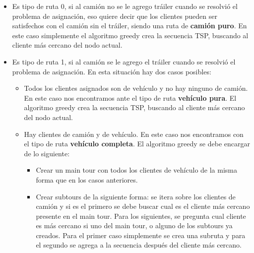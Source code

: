 \documentclass[letter, 10pt]{article}
\begin{document}
\begin{itemize}
    \item Es tipo de ruta 0, si al camión no se le agrego tráiler cuando se resolvió el problema de asignación, eso quiere decir que los clientes pueden ser satisfechos con el camión sin el tráiler, siendo una ruta de \textbf{camión puro}. En este caso simplemente el algoritmo greedy crea la secuencia TSP, buscando al cliente más cercano del nodo actual.
    \item Es tipo de ruta 1, si al camión se le agrego el tráiler cuando se resolvió el problema de asignación. En esta situación hay dos casos posibles:
    \begin{itemize}
        \item Todos los clientes asignados son de vehículo y no hay ninguno de camión. En este caso nos encontramos ante el tipo de ruta \textbf{vehículo pura}. El algoritmo greedy crea la secuencia TSP, buscando al cliente más cercano del nodo actual.
        \item Hay clientes de camión y de vehículo. En este caso nos encontramos con el tipo de ruta \textbf{vehículo completa}. El algoritmo greedy se debe encargar de lo siguiente:
        \begin{itemize}
            \item Crear un main tour con todos los clientes de vehículo de la misma forma que en los casos anteriores.
            \item Crear subtours de la siguiente forma: se itera sobre los clientes de camión y si es el primero se debe buscar cual es el cliente más cercano presente en el main tour. Para los siguientes, se pregunta cual cliente es más cercano si uno del main tour, o alguno de los subtours ya creados. Para el primer caso simplemente se crea una subruta y para el segundo se agrega a la secuencia después del cliente más cercano.
        \end{itemize}
    \end{itemize}
\end{itemize}
\end{document}
